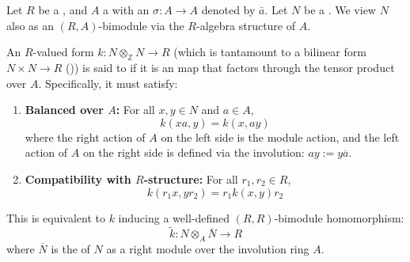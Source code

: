 \begin{definition} \label{definition:admits_a_symmetric_algebra_with_involution_over_a_ring_for_a_bilinear_form_on_a_finitely_generated_projective_module}
    Let $R$ be a , and $A$ a  with an  $\sigma: A \to A$ denoted by $\bar{a}$.
    Let $N$ be a   . 
    We view $N$ also as an $(R, A)$-bimodule via the $R$-algebra structure of $A$.

    An $R$-valued form $k: N \otimes_{\mathbb{Z}} N \to R$ (which is tantamount to a bilinear form $N \times N \to R$ ()) is said to  if 
    it is an  map that factors through the tensor product over $A$.
    Specifically, it must satisfy:
    \begin{enumerate}
        \item \textbf{Balanced over $A$:} For all $x, y \in N$ and $a \in A$,
        $$ k(xa, y) = k(x, ay) $$
        where the right action of $A$ on the left side is the module action, 
        and the left action of $A$ on the right side is defined via the involution: $ay := y\overline{a}$.
        \item \textbf{Compatibility with $R$-structure:} For all $r_1, r_2 \in R$,
        $$ k(r_1x, yr_2) = r_1 k(x, y) r_2 $$
    \end{enumerate}
    This is equivalent to $k$ inducing a well-defined $(R, R)$-bimodule homomorphism:
    $$ \tilde{k}: N \otimes_{A} \overline{N} \longrightarrow R $$
    where $\overline{N}$ is the  of $N$ as a right module over the involution ring $A$.
\end{definition}